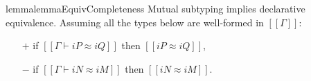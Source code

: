 \begin{restatable}{lemma}{lemmaEquivCompleteness} 
    \label{lemma:equiv-completeness}
    Mutual subtyping implies declarative equivalence.
    Assuming all the types below are well-formed in $[[Γ]]$: 
    \begin{itemize}
    \item[$+$] if $[[Γ ⊢ iP ≈ iQ]]$ then $[[iP ≈ iQ]]$,
    \item[$-$] if $[[Γ ⊢ iN ≈ iM]]$ then $[[iN ≈ iM]]$.
    \end{itemize}
\end{restatable}



